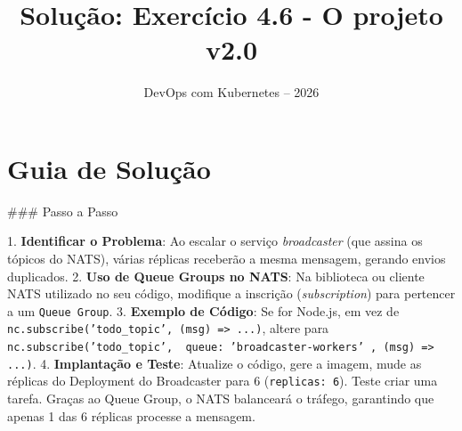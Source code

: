 \documentclass[11pt,a4paper]{article}
\title{\color{secondary}\Huge\textbf{Solução: Exercício 4.6 - O projeto v2.0}}
\author{\color{primary}DevOps com Kubernetes -- 2026}
\date{}
\begin{document}
\maketitle

\section*{\color{primary}Guia de Solução}
\begin{tcolorbox}[colback=green!5!white,colframe=green!60!black,title=Resolução Passo a Passo]
### Passo a Passo

1. \textbf{Identificar o Problema}: Ao escalar o serviço \textit{broadcaster} (que assina os tópicos do NATS), várias réplicas receberão a mesma mensagem, gerando envios duplicados.
2. \textbf{Uso de Queue Groups no NATS}: Na biblioteca ou cliente NATS utilizado no seu código, modifique a inscrição (\textit{subscription}) para pertencer a um \texttt{Queue Group}.
3. \textbf{Exemplo de Código}: Se for Node.js, em vez de \texttt{nc.subscribe('todo_topic', (msg) => {...})}, altere para \texttt{nc.subscribe('todo_topic', { queue: 'broadcaster-workers' }, (msg) => {...})}.
4. \textbf{Implantação e Teste}: Atualize o código, gere a imagem, mude as réplicas do Deployment do Broadcaster para 6 (\texttt{replicas: 6}). Teste criar uma tarefa. Graças ao Queue Group, o NATS balanceará o tráfego, garantindo que apenas 1 das 6 réplicas processe a mensagem.
\end{tcolorbox}
\end{document}
